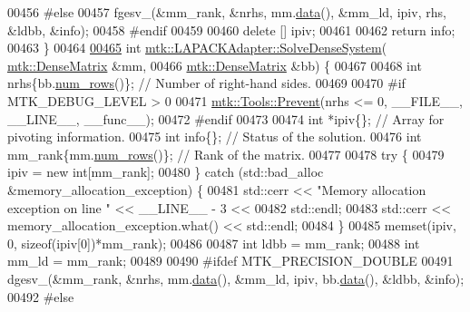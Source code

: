 \begin{DoxyCode}
00456 \textcolor{preprocessor}{  #else}
00457   fgesv\_(&mm\_rank, &nrhs, mm.\hyperlink{classmtk_1_1DenseMatrix_a16b3ff56feb2658b9fc7147d1de4d8e7}{data}(), &mm\_ld, ipiv, rhs, &ldbb, &info);
00458 \textcolor{preprocessor}{  #endif}
00459 
00460   \textcolor{keyword}{delete} [] ipiv;
00461 
00462   \textcolor{keywordflow}{return} info;
00463 \}
00464 
\hypertarget{mtk__lapack__adapter_8cc_source_l00465}{}\hyperlink{classmtk_1_1LAPACKAdapter_af0723bba1d73450119d093b9cf1ff6f0}{00465} \textcolor{keywordtype}{int} \hyperlink{classmtk_1_1LAPACKAdapter_a7428bccf74fd4a4af68fb7233846da22}{mtk::LAPACKAdapter::SolveDenseSystem}(
      \hyperlink{classmtk_1_1DenseMatrix}{mtk::DenseMatrix} &mm,
00466                                          \hyperlink{classmtk_1_1DenseMatrix}{mtk::DenseMatrix} &bb) \{
00467 
00468   \textcolor{keywordtype}{int} nrhs\{bb.\hyperlink{classmtk_1_1DenseMatrix_a17d8d3b9cc0926044b6972dd190a5c21}{num\_rows}()\};  \textcolor{comment}{// Number of right-hand sides.}
00469 
00470 \textcolor{preprocessor}{  #if MTK\_DEBUG\_LEVEL > 0}
00471   \hyperlink{classmtk_1_1Tools_afe5bb096309258e2e72503fd7b41c7e0}{mtk::Tools::Prevent}(nrhs <= 0, \_\_FILE\_\_, \_\_LINE\_\_, \_\_func\_\_);
00472 \textcolor{preprocessor}{  #endif}
00473 
00474   \textcolor{keywordtype}{int} *ipiv\{\};                \textcolor{comment}{// Array for pivoting information.}
00475   \textcolor{keywordtype}{int} info\{\};                 \textcolor{comment}{// Status of the solution.}
00476   \textcolor{keywordtype}{int} mm\_rank\{mm.\hyperlink{classmtk_1_1DenseMatrix_a17d8d3b9cc0926044b6972dd190a5c21}{num\_rows}()\}; \textcolor{comment}{// Rank of the matrix.}
00477 
00478   \textcolor{keywordflow}{try} \{
00479     ipiv = \textcolor{keyword}{new} \textcolor{keywordtype}{int}[mm\_rank];
00480   \} \textcolor{keywordflow}{catch} (std::bad\_alloc &memory\_allocation\_exception) \{
00481     std::cerr << \textcolor{stringliteral}{"Memory allocation exception on line "} << \_\_LINE\_\_ - 3 <<
00482       std::endl;
00483     std::cerr << memory\_allocation\_exception.what() << std::endl;
00484   \}
00485   memset(ipiv, 0, \textcolor{keyword}{sizeof}(ipiv[0])*mm\_rank);
00486 
00487   \textcolor{keywordtype}{int} ldbb = mm\_rank;
00488   \textcolor{keywordtype}{int} mm\_ld = mm\_rank;
00489 
00490 \textcolor{preprocessor}{  #ifdef MTK\_PRECISION\_DOUBLE}
00491   dgesv\_(&mm\_rank, &nrhs, mm.\hyperlink{classmtk_1_1DenseMatrix_a16b3ff56feb2658b9fc7147d1de4d8e7}{data}(), &mm\_ld, ipiv, bb.\hyperlink{classmtk_1_1DenseMatrix_a16b3ff56feb2658b9fc7147d1de4d8e7}{data}(), &ldbb, &info);
00492 \textcolor{preprocessor}{  #else}

\end{DoxyCode}

